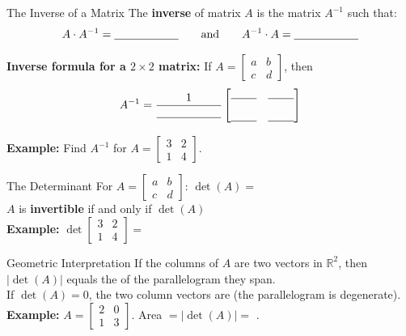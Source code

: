 \documentclass[10pt]{article}
\begin{document}
\vspace{0.08in}

\begin{notesbox}{The Inverse of a Matrix}
The \textbf{inverse} of matrix $A$ is the matrix $A^{-1}$ such that:
\[
    A \cdot A^{-1} = \blank{2cm} \qquad \text{and} \qquad A^{-1} \cdot A = \blank{2cm}
\]

\textbf{Inverse formula for a $2\times2$ matrix:} If $A = \begin{bmatrix}a&b\\c&d\end{bmatrix}$, then
\[
    A^{-1} = \dfrac{1}{\blank{2cm}}\begin{bmatrix}\blank{0.8cm} & \blank{0.8cm} \\[8pt]
    \blank{0.8cm} & \blank{0.8cm}\end{bmatrix}
\]

\textbf{Example:} Find $A^{-1}$ for $A = \begin{bmatrix}3&2\\1&4\end{bmatrix}$.
\vspace{0.7in}
\end{notesbox}

\vspace{0.08in}

\begin{notesbox}{The Determinant}
For $A = \begin{bmatrix}a&b\\c&d\end{bmatrix}$: \quad
$\det(A) = $ \blank{4cm}\\[10pt]

$A$ is \textbf{invertible} if and only if $\det(A)$ \blank{3cm}\\[6pt]

\textbf{Example:} $\det\begin{bmatrix}3&2\\1&4\end{bmatrix} = $ \blank{5cm}
\end{notesbox}

\vspace{0.08in}

\begin{notesbox}{Geometric Interpretation}
If the columns of $A$ are two vectors in $\mathbb{R}^2$, then $|\det(A)|$ equals the
\blank{5cm} of the parallelogram they span.\\[6pt]

If $\det(A) = 0$, the two column vectors are \blank{4cm} (the parallelogram is degenerate).\\[8pt]

\textbf{Example:} $A = \begin{bmatrix}2&0\\1&3\end{bmatrix}$. \quad
Area $= |\det(A)| = $ \blank{4cm}.
\end{notesbox}
\end{document}
